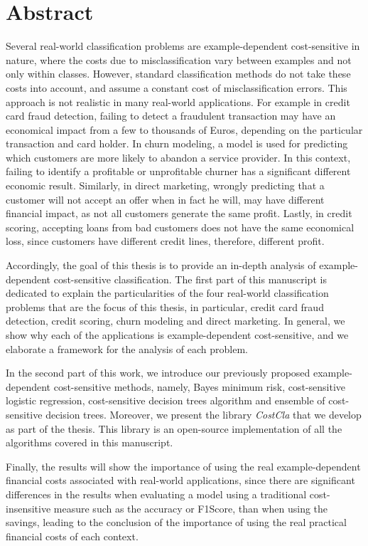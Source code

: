 \chapter*{Abstract}

Several real-world classification problems are example-dependent cost-sensitive in nature, where the 
costs due to misclassification vary between examples and not only within classes. However, standard 
classification methods do not take these costs into account, and assume a constant cost of 
misclassification errors. This approach is not realistic in many real-world applications. For  
example in credit card fraud detection, failing to detect a fraudulent transaction may have an 
economical impact from a few to thousands of Euros, depending on the particular transaction and card 
holder. In churn modeling, a model is used for predicting which customers are more likely to 
abandon a service provider. In this context, failing to identify a   profitable or unprofitable 
churner has a significant different economic   result. Similarly, in direct marketing, wrongly 
predicting that a customer   will not accept an offer when in fact he will, may have different 
financial impact, as not all   customers generate the same profit. Lastly, in credit scoring, 
accepting   loans from bad customers does not have the same economical loss, since customers have 
different   credit lines, therefore, different profit.

Accordingly, the goal of this thesis is to provide an in-depth analysis of example-dependent 
cost-sensitive classification. The first part of this manuscript is dedicated to explain the 
particularities of the four real-world classification problems that are the focus of this thesis, in 
particular, credit card fraud detection, credit scoring, churn modeling and direct marketing. In 
general, we show why each of the applications is example-dependent cost-sensitive, and we elaborate 
a framework for the analysis of each problem. 


In the second part of this work, we introduce our previously proposed example-dependent 
cost-sensitive methods, namely, Bayes minimum risk, cost-sensitive logistic regression, 
cost-sensitive decision trees algorithm and ensemble of cost-sensitive decision trees.
Moreover, we present the library \mbox{\textit{CostCla}} that we develop as part of the thesis. 
This library is an open-source implementation of all the algorithms covered in this manuscript.


Finally, the results will show the importance of using the real example-dependent financial 
costs associated with real-world applications, since there are significant differences in the 
results when evaluating a model using a traditional cost-insensitive measure such as the accuracy 
or F1Score,  than when using the savings, leading to the conclusion of the importance of using the 
real practical financial costs of each context.


